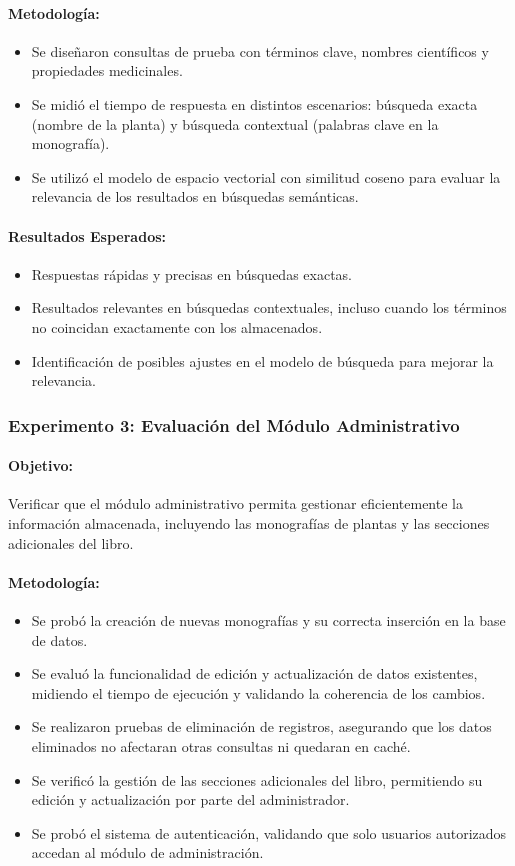 \paragraph{Metodología:}
\begin{itemize}
    \item Se diseñaron consultas de prueba con términos clave, nombres científicos y propiedades medicinales.
    \item Se midió el tiempo de respuesta en distintos escenarios: búsqueda exacta (nombre de la planta) y búsqueda contextual (palabras clave en la monografía).
    \item Se utilizó el modelo de espacio vectorial con similitud coseno para evaluar la relevancia de los resultados en búsquedas semánticas.
\end{itemize}
\paragraph{Resultados Esperados:}
\begin{itemize}
    \item Respuestas rápidas y precisas en búsquedas exactas.
    \item Resultados relevantes en búsquedas contextuales, incluso cuando los términos no coincidan exactamente con los almacenados.
    \item Identificación de posibles ajustes en el modelo de búsqueda para mejorar la relevancia.
\end{itemize}

\vspace{2cm}
\subsubsection*{Experimento 3: Evaluación del Módulo Administrativo}
\paragraph{Objetivo:}
Verificar que el módulo administrativo permita gestionar eficientemente la información almacenada, incluyendo las monografías de plantas y las secciones adicionales del libro.
\paragraph{Metodología:}
\begin{itemize}
    \item Se probó la creación de nuevas monografías y su correcta inserción en la base de datos.
    \item Se evaluó la funcionalidad de edición y actualización de datos existentes, midiendo el tiempo de ejecución y validando la coherencia de los cambios.
    \item Se realizaron pruebas de eliminación de registros, asegurando que los datos eliminados no afectaran otras consultas ni quedaran en caché.
    \item Se verificó la gestión de las secciones adicionales del libro, permitiendo su edición y actualización por parte del administrador.
    \item Se probó el sistema de autenticación, validando que solo usuarios autorizados accedan al módulo de administración.
\end{itemize}
